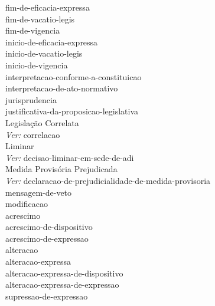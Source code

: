 \Gls{fim-de-eficacia-expressa} \\ 
\Gls{fim-de-vacatio-legis} \\ 
\Gls{fim-de-vigencia} \\ 
\Gls{inicio-de-eficacia-expressa} \\ 
\Gls{inicio-de-vacatio-legis} \\ 
\Gls{inicio-de-vigencia} \\ 
\Gls{interpretacao-conforme-a-constituicao} \\ 
\Gls{interpretacao-de-ato-normativo} \\ 
\Gls{jurisprudencia} \\ 
\Gls{justificativa-da-proposicao-legislativa} \\ 
Legislação Correlata \\ 
 \hspace*{1.0cm}\glosshsep \textit{Ver:} \Gls{correlacao} \\ 
Liminar \\ 
 \hspace*{1.0cm}\glosshsep \textit{Ver:} \Gls{decisao-liminar-em-sede-de-adi} \\ 
Medida Provisória Prejudicada \\ 
 \hspace*{1.0cm}\glosshsep \textit{Ver:} \Gls{declaracao-de-prejudicialidade-de-medida-provisoria} \\ 
\Gls{mensagem-de-veto} \\ 
\Gls{modificacao} \\ 
 \hspace*{1.0cm}\glosshsep \Gls{acrescimo} \\ 
 \hspace*{2.0cm}\glosshsep \Gls{acrescimo-de-dispositivo} \\ 
 \hspace*{2.0cm}\glosshsep \Gls{acrescimo-de-expressao} \\ 
 \hspace*{1.0cm}\glosshsep \Gls{alteracao} \\ 
 \hspace*{2.0cm}\glosshsep \Gls{alteracao-expressa} \\ 
 \hspace*{3.0cm}\glosshsep \Gls{alteracao-expressa-de-dispositivo} \\ 
 \hspace*{3.0cm}\glosshsep \Gls{alteracao-expressa-de-expressao} \\ 
 \hspace*{3.0cm}\glosshsep \Gls{supressao-de-expressao} \\ 
